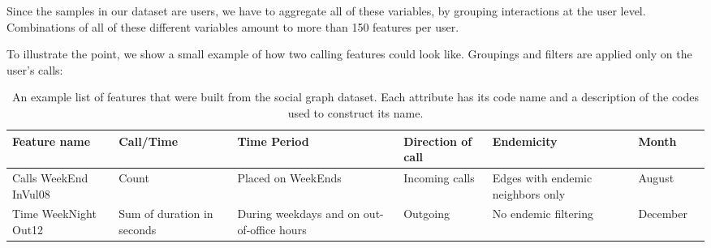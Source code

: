



Since the samples in our dataset are users, we have to aggregate all of these variables, by grouping interactions at the user level.
Combinations of all of these different variables amount to more than 150 features per user.

To illustrate the point, we show a small example of how two calling features could look like.
Groupings and filters are applied only on the user's calls:

\begin{table}[ht]
	\caption{An example list of features that were built from the social graph dataset.
Each attribute has its code name and a description of the codes used to construct its name.}\label{tab:data_example}
	\footnotesize
	\centering
	\begin{tabular} {|p{1.5cm}|p{1.5cm}|p{2cm}|p{1.5cm}|p{2cm}|p{1.5cm}|p{1cm}}
		\hline
		Feature name & Call/Time & Time Period & Direction of call & Endemicity & Month \\
		\hline
		Calls WeekEnd InVul08    & Count & Placed on WeekEnds & Incoming calls & Edges with endemic neighbors only & August\\
		\hline
		Time WeekNight Out12 & Sum of duration in seconds & During weekdays and on out-of-office hours & Outgoing   & No endemic filtering   & December \\
		\hline
	\end{tabular}
\end{table}



